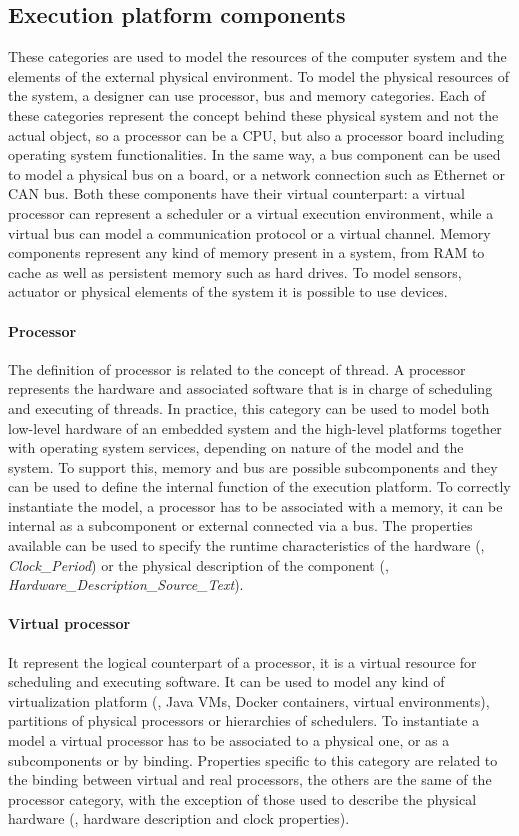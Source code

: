 \subsection{Execution platform components}
These categories are used to model the resources of the computer system and the elements of the external physical environment. To model the physical resources of the system, a designer can use processor,  bus and memory categories. Each of these categories represent the concept behind these physical system and not the actual object, so a processor can be a CPU, but also a processor board including operating system functionalities. In the same way, a bus component can be used to model a physical bus on a board, or a network connection such as Ethernet or CAN bus. Both these components have their virtual counterpart: a virtual processor can represent a scheduler or a virtual execution environment, while a virtual bus can model a communication protocol or a virtual channel. Memory components represent any kind of memory present in a system, from RAM to cache as well as persistent memory such as hard drives. To model sensors, actuator or physical elements of the system it is possible to use devices.

\paragraph{Processor} The definition of processor is related to the concept of thread. A processor represents the hardware and associated software that is in charge of scheduling  and executing of threads. In practice, this category can be used to model both low-level hardware of an embedded system and the high-level platforms together with operating system services, depending on nature of the model and the system. To support this, memory and bus are possible subcomponents and they can be used to define the internal function of the execution platform. To correctly instantiate the model, a processor has to be associated with a memory, it can be internal as a subcomponent or external connected via a bus. The properties available can be used to specify the runtime characteristics of the hardware (\eg, \textit{Clock\_Period}) or the physical description of the component (\eg, \textit{Hardware\_Description\_Source\_Text}).

\paragraph{Virtual processor} It represent the logical counterpart of a processor, it is a virtual resource for scheduling and executing software. It can be used to model any kind of virtualization platform (\eg, Java VMs, Docker containers, virtual environments), partitions of physical processors or hierarchies of schedulers. To instantiate a model a virtual processor has to be associated to a physical one, or as a subcomponents or by binding. Properties specific to this category are related to the binding between virtual and real processors, the others are the same of the processor category, with the exception of those used to describe the physical hardware (\eg, hardware description and clock properties).

